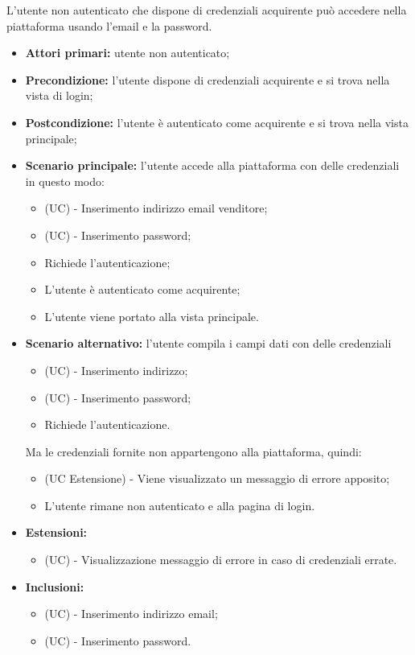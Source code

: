 L'utente non autenticato che dispone di credenziali acquirente può accedere nella piattaforma usando l'email e la password.
\begin{itemize}
	\item \textbf{Attori primari:} utente non autenticato;
	\item \textbf{Precondizione:} l'utente dispone di credenziali acquirente e si trova nella vista di login;
	\item \textbf{Postcondizione:} l'utente è autenticato come acquirente e si trova nella vista principale;
	\item \textbf{Scenario principale:} l'utente accede alla piattaforma con delle credenziali in questo modo:
	\begin{itemize}
		\item (UC) - Inserimento indirizzo email venditore;
		\item (UC) - Inserimento password;
		\item Richiede l'autenticazione;
		\item L'utente è autenticato come acquirente;
		\item L'utente viene portato alla vista principale.
	\end{itemize}
	\item \textbf{Scenario alternativo:} l'utente compila i campi dati con delle credenziali
	\begin{itemize}
		\item (UC) - Inserimento indirizzo;
		\item (UC) - Inserimento password;
		\item Richiede l'autenticazione.
	\end{itemize}
	Ma le credenziali fornite non appartengono alla piattaforma, quindi:
	\begin{itemize}
		\item (UC Estensione) - Viene visualizzato un messaggio di errore apposito;
		\item L'utente rimane non autenticato e alla pagina di login.
	\end{itemize}
	\item \textbf{Estensioni:}
	\begin{itemize}
		\item (UC) - Visualizzazione messaggio di errore in caso di credenziali errate.
	\end{itemize}
	\item \textbf{Inclusioni:}
	\begin{itemize}
		\item (UC) - Inserimento indirizzo email;
		\item (UC) - Inserimento  password. 
		\end{itemize}
\end{itemize}

